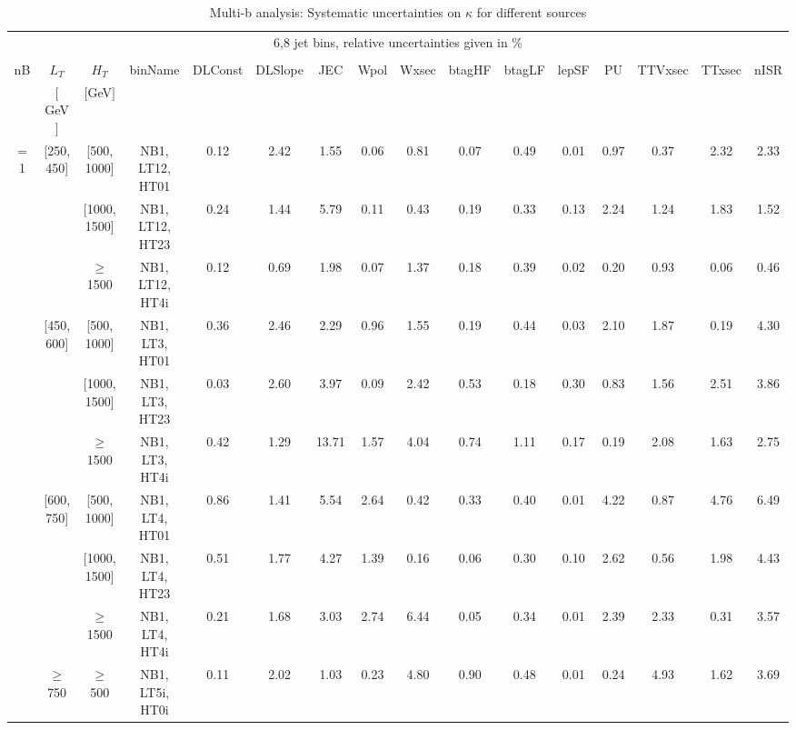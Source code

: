 \begin{sidewaystable}[ht] 
 \tiny 
\caption{Multi-b analysis: Systematic uncertainties on $\kappa$ for different sources} 
\begin{center} 
\label{tab:sysTable} 
\begin{tabular}{|c | c | c | c | c | c | c | c | c | c | c | c | c | c | c | c | } 
\hline 
\multicolumn{16}{|c|}{6,8 jet bins, relative uncertainties given in \%} \\ 
\multicolumn{16}{|c|}{} \\ \hline 
nB &  $L_T$ & $H_T$ & binName & DLConst & DLSlope & JEC & Wpol & Wxsec & btagHF & btagLF & lepSF & PU & TTVxsec & TTxsec & nISR  \\ 
   & $[$ GeV $]$  &  $[$GeV$]$  &  &  &  &  &  &  &  &  &  &  &  &  &   \\ \hline 
\cline{1-16} $=$ 1 & [250, 450] & [500, 1000]&NB1, LT12, HT01 & 0.12 & 2.42 & 1.55 & 0.06 & 0.81 & 0.07 & 0.49 & 0.01 & 0.97 & 0.37 & 2.32 & 2.33 \\ 
\cline{3-16}  & & [1000, 1500] &NB1, LT12, HT23 & 0.24 & 1.44 & 5.79 & 0.11 & 0.43 & 0.19 & 0.33 & 0.13 & 2.24 & 1.24 & 1.83 & 1.52 \\ 
\cline{3-16}  & & $\geq$ 1500 &NB1, LT12, HT4i & 0.12 & 0.69 & 1.98 & 0.07 & 1.37 & 0.18 & 0.39 & 0.02 & 0.20 & 0.93 & 0.06 & 0.46 \\ 
\cline{2-16}   & [450, 600] & [500, 1000]&NB1, LT3, HT01 & 0.36 & 2.46 & 2.29 & 0.96 & 1.55 & 0.19 & 0.44 & 0.03 & 2.10 & 1.87 & 0.19 & 4.30 \\ 
\cline{3-16}  & & [1000, 1500] &NB1, LT3, HT23 & 0.03 & 2.60 & 3.97 & 0.09 & 2.42 & 0.53 & 0.18 & 0.30 & 0.83 & 1.56 & 2.51 & 3.86 \\ 
\cline{3-16}  & & $\geq$ 1500 &NB1, LT3, HT4i & 0.42 & 1.29 & 13.71 & 1.57 & 4.04 & 0.74 & 1.11 & 0.17 & 0.19 & 2.08 & 1.63 & 2.75 \\ 
\cline{2-16}   & [600, 750] & [500, 1000]&NB1, LT4, HT01 & 0.86 & 1.41 & 5.54 & 2.64 & 0.42 & 0.33 & 0.40 & 0.01 & 4.22 & 0.87 & 4.76 & 6.49 \\ 
\cline{3-16}  & & [1000, 1500] &NB1, LT4, HT23 & 0.51 & 1.77 & 4.27 & 1.39 & 0.16 & 0.06 & 0.30 & 0.10 & 2.62 & 0.56 & 1.98 & 4.43 \\ 
\cline{3-16}  & & $\geq$ 1500 &NB1, LT4, HT4i & 0.21 & 1.68 & 3.03 & 2.74 & 6.44 & 0.05 & 0.34 & 0.01 & 2.39 & 2.33 & 0.31 & 3.57 \\ 
\cline{2-16}   & $\geq$ 750 & $\geq$ 500&NB1, LT5i, HT0i & 0.11 & 2.02 & 1.03 & 0.23 & 4.80 & 0.90 & 0.48 & 0.01 & 0.24 & 4.93 & 1.62 & 3.69 \\ 

\end{tabular}
\end{center}
\end{sidewaystable}

